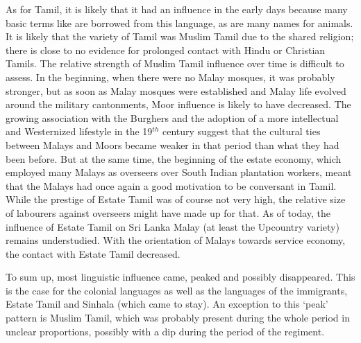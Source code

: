 As for Tamil, it is likely that it had an influence in the early days because many basic terms like  are borrowed from this language, as are many names for animals. It is likely that the variety of Tamil was Muslim Tamil due to the shared religion; there is close to no evidence for prolonged contact with Hindu or Christian Tamils. The relative strength of Muslim Tamil influence over time is difficult to assess. In the beginning, when there were no Malay mosques, it was probably stronger, but as soon as Malay mosques were established and Malay life evolved around the military cantonments, Moor influence is likely to have decreased. The growing association with the Burghers and the adoption of a more intellectual and Westernized lifestyle in the 19$^{th}$ century suggest that the cultural ties between Malays and Moors became weaker in that period than what they had been before. But at the same time, the beginning of the estate economy, which employed many Malays as overseers over South Indian plantation workers, meant that the Malays had once again a good motivation to be conversant in Tamil. While the prestige of Estate Tamil was of course not very high, the relative size of labourers against overseers might have made up for that. As of today, the influence of Estate Tamil on Sri Lanka Malay (at least the Upcountry variety) remains understudied. With the orientation of Malays towards service economy, the contact with Estate Tamil decreased.

To sum up, most linguistic influence came, peaked and possibly disappeared. This is the case for the colonial languages as well as the languages of the immigrants, Estate Tamil and  Sinhala (which came to stay). An exception to this `peak' pattern is Muslim Tamil, which was probably present during the whole period in unclear proportions, possibly with a dip during the period of the regiment.

